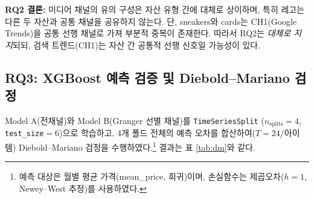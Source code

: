 \documentclass[11pt, a4paper, twocolumn]{article}
\begin{document}
\noindent\textbf{RQ2 결론:} 미디어 채널의 유의 구성은 자산 유형 간에
대체로 상이하며, 특히 레고는 다른 두 자산과 공통 채널을 공유하지
않는다. 단, sneakers와 cards는 CH1(Google Trends)을 공통 선행 채널로
가져 부분적 중복이 존재한다. 따라서 RQ2는 \emph{대체로 지지}되되,
검색 트렌드(CH1)는 자산 간 공통적 선행 신호일 가능성이 있다.

\subsection{RQ3: XGBoost 예측 검증 및 Diebold--Mariano 검정}
\label{sec:results-rq3}

Model A(전채널)와 Model B(Granger 선별 채널)를 \texttt{TimeSeriesSplit}
($n_{\text{splits}}=4$, \texttt{test\_size}$=6$)으로 학습하고, 4개
폴드 전체의 예측 오차를 합산하여($T=24$/아이템) Diebold--Mariano
검정을 수행하였다.\footnote{예측 대상은 월별 평균 가격(\textsf{mean\_price},
회귀)이며, 손실함수는 제곱오차($h=1$, Newey--West 추정)를 사용하였다.}
결과는 표 \ref{tab:dm}와 같다.
\end{document}
